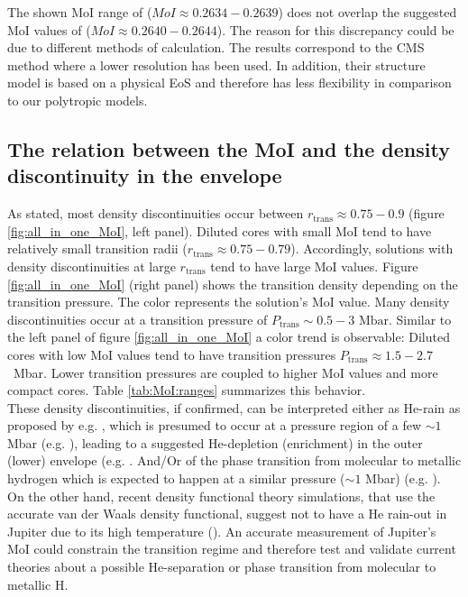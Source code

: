 \documentclass[usenatbib]{mnras}
\newcommand{\sub}[1]{_{\text{#1}}}
\begin{document}
The shown MoI range of ($MoI \approx 0.2634  - 0.2639$) does not overlap the suggested MoI values of \cite{2017Wahl} ($MoI \approx 0.2640 - 0.2644$). The reason for this discrepancy could be due to different methods of calculation.
The \cite{2017Wahl} results correspond to the CMS method where a lower resolution has been used. In addition, their structure model is based on a physical EoS and therefore has less flexibility in comparison to our polytropic models. 

\subsection{The relation between the MoI and the density discontinuity in the envelope} \label{subsection:Transition_behavior}
As stated, most density discontinuities occur between $r\sub{trans} \approx 0.75-0.9$ (figure \ref{fig:all_in_one_MoI}, left panel). 
Diluted cores with small MoI tend to have relatively small transition radii ($r\sub{trans} \approx 0.75 -0.79$).
Accordingly, solutions with density discontinuities at large $r\sub{trans}$ tend to have large MoI values. Figure \ref{fig:all_in_one_MoI} (right panel) shows the transition density depending on the transition pressure. The color represents the solution's MoI value. Many density discontinuities occur at a transition pressure of $P\sub{trans} \sim 0.5 - 3 \text{~Mbar}$. Similar to the left panel of figure \ref{fig:all_in_one_MoI} a color trend is observable: Diluted cores with low MoI values tend to have transition pressures $P\sub{trans} \approx 1.5 - 2.7$~Mbar. Lower transition pressures are coupled to higher MoI values and more compact cores. Table \ref{tab:MoI:ranges} summarizes this behavior. \\
These density discontinuities, if confirmed, can be interpreted either as He-rain as proposed by e.g. \cite{Stevenson1975, Stevenson1998}, which is presumed to occur at a pressure region of a few $\sim1$ Mbar (e.g. \cite{Lorenzen2009, Lorenzen2011, Morales2013, Militzer2016, Wilson2010}), leading to a suggested He-depletion (enrichment) in the outer (lower) envelope (e.g. \cite{Guillot1999, Nettelmann2008, Nettelmann2012}. And/Or of the phase transition from molecular to metallic hydrogen which is expected to happen at a similar pressure ($\sim1$ Mbar) (e.g. \cite{Stevenson2013,Helled2018,Mazzola2018}). On the other hand, recent density functional theory simulations, that use the accurate van der Waals density functional, suggest not to have a He rain-out in Jupiter due to its high temperature (\cite{Schottler2018}). An accurate measurement of Jupiter's MoI could constrain the transition regime and therefore test and validate current theories about a possible He-separation or phase transition from molecular to metallic H.  \\ 
\end{document}

